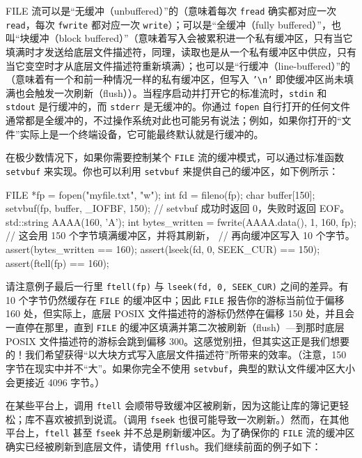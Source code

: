 FILE 流可以是“无缓冲（unbuffered）”的（意味着每次 \texttt{fread} 确实都对应一次 \texttt{read}，每次 \texttt{fwrite} 都对应一次 \texttt{write}）；可以是“全缓冲（fully buffered）”，也叫“块缓冲（block buffered）”（意味着写入会被累积进一个私有缓冲区，只有当它填满时才发送给底层文件描述符，同理，读取也是从一个私有缓冲区中供应，只有当它变空时才从底层文件描述符重新填满）；也可以是“行缓冲（line-buffered）”的（意味着有一个和前一种情况一样的私有缓冲区，但写入 \texttt{'\textbackslash n'} 即使缓冲区尚未填满也会触发一次刷新（flush））。当程序启动并打开它的标准流时，\texttt{stdin} 和 \texttt{stdout} 是行缓冲的，而 \texttt{stderr} 是无缓冲的。你通过 \texttt{fopen} 自行打开的任何文件通常都是全缓冲的，不过操作系统对此也可能另有说法；例如，如果你打开的“文件”实际上是一个终端设备，它可能最终默认就是行缓冲的。

在极少数情况下，如果你需要控制某个 \texttt{FILE} 流的缓冲模式，可以通过标准函数 \texttt{setvbuf} 来实现。你也可以利用 \texttt{setvbuf} 来提供自己的缓冲区，如下例所示：

\begin{codebox}[cpp]
 FILE *fp = fopen("myfile.txt", "w");
    int fd = fileno(fp);
    char buffer[150];
    setvbuf(fp, buffer, _IOFBF, 150);
      // setvbuf 成功时返回 0，失败时返回 EOF。
    std::string AAAA(160, 'A');
    int bytes_written = fwrite(AAAA.data(), 1, 160, fp);
      // 这会用 150 个字节填满缓冲区，并将其刷新，
      // 再向缓冲区写入 10 个字节。
    assert(bytes_written == 160);
    assert(lseek(fd, 0, SEEK_CUR) == 150);
    assert(ftell(fp) == 160);
\end{codebox}

请注意例子最后一行里 \texttt{ftell(\allowbreak{}fp)\allowbreak{}} 与 \texttt{lseek(\allowbreak{}fd,\allowbreak{} 0,\allowbreak{} SEEK\_\allowbreak{}CUR)\allowbreak{}} 之间的差异。有 10 个字节仍然缓存在 \texttt{FILE} 的缓冲区中；因此 \texttt{FILE} 报告你的游标当前位于偏移 160 处，但实际上，底层 POSIX 文件描述符的游标仍然停在偏移 150 处，并且会一直停在那里，直到 \texttt{FILE} 的缓冲区填满并第二次被刷新（flush）—到那时底层 POSIX 文件描述符的游标会跳到偏移 300。这感觉别扭，但其实这正是我们想要的！我们希望获得“以大块方式写入底层文件描述符”所带来的效率。（注意，150 字节在现实中并不“大”。如果你完全不使用 \texttt{setvbuf}，典型的默认文件缓冲区大小会更接近 4096 字节。）

在某些平台上，调用 \texttt{ftell} 会顺带导致缓冲区被刷新，因为这能让库的簿记更轻松；库不喜欢被抓到说谎。（调用 \texttt{fseek} 也很可能导致一次刷新。）然而，在其他平台上，\texttt{ftell} 甚至 \texttt{fseek} 并不总是刷新缓冲区。为了确保你的 \texttt{FILE} 流的缓冲区确实已经被刷新到底层文件，请使用 \texttt{fflush}。我们继续前面的例子如下：

